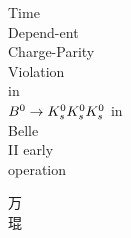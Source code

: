 \documentclass[10pt,a4paper]{book}
\begin{document}
   \cleardoublepage
   \thispagestyle{empty}
   \vspace*{4mm} 
  \begin{center}
       {
        \begin{minipage}{1em}
            \fontsize{8pt}{8pt}\selectfont 	
            Time \\
            Depend-ent \\
            Charge-Parity\\
            Violation\\
            in\\
            $B^0\to 
            K^0_s \\
            K^0_s \\
            K^0_s\\$
            in\\
            Belle\\
            II
            early\\
            operation
            
            \vspace{5cm}
            \centering
            \begin{CJK}{UTF8}{min}
            	\fontsize{15pt}{15pt}
            	
            	   \space 万\\
            	 \vspace{0.5cm}
            	    琨\\
            \end{CJK}
        \end{minipage}
       }
     \end{center}
    \clearpage
  
\end{document}
